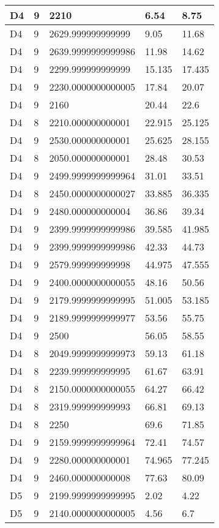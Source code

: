 \begin{longtable}{|l|l|l|l|l|}
D4 & 9 & 2210 & 6.54 & 8.75 \\ \hline
D4 & 9 & 2629.999999999999 & 9.05 & 11.68 \\ \hline
D4 & 9 & 2639.9999999999986 & 11.98 & 14.62 \\ \hline
D4 & 9 & 2299.999999999999 & 15.135 & 17.435 \\ \hline
D4 & 9 & 2230.0000000000005 & 17.84 & 20.07 \\ \hline
D4 & 9 & 2160 & 20.44 & 22.6 \\ \hline
D4 & 8 & 2210.000000000001 & 22.915 & 25.125 \\ \hline
D4 & 9 & 2530.000000000001 & 25.625 & 28.155 \\ \hline
D4 & 8 & 2050.000000000001 & 28.48 & 30.53 \\ \hline
D4 & 9 & 2499.9999999999964 & 31.01 & 33.51 \\ \hline
D4 & 8 & 2450.0000000000027 & 33.885 & 36.335 \\ \hline
D4 & 9 & 2480.000000000004 & 36.86 & 39.34 \\ \hline
D4 & 9 & 2399.9999999999986 & 39.585 & 41.985 \\ \hline
D4 & 9 & 2399.9999999999986 & 42.33 & 44.73 \\ \hline
D4 & 9 & 2579.999999999998 & 44.975 & 47.555 \\ \hline
D4 & 9 & 2400.0000000000055 & 48.16 & 50.56 \\ \hline
D4 & 9 & 2179.9999999999995 & 51.005 & 53.185 \\ \hline
D4 & 9 & 2189.9999999999977 & 53.56 & 55.75 \\ \hline
D4 & 9 & 2500 & 56.05 & 58.55 \\ \hline
D4 & 8 & 2049.9999999999973 & 59.13 & 61.18 \\ \hline
D4 & 8 & 2239.999999999995 & 61.67 & 63.91 \\ \hline
D4 & 8 & 2150.0000000000055 & 64.27 & 66.42 \\ \hline
D4 & 8 & 2319.999999999993 & 66.81 & 69.13 \\ \hline
D4 & 8 & 2250 & 69.6 & 71.85 \\ \hline
D4 & 9 & 2159.9999999999964 & 72.41 & 74.57 \\ \hline
D4 & 9 & 2280.000000000001 & 74.965 & 77.245 \\ \hline
D4 & 9 & 2460.000000000008 & 77.63 & 80.09 \\ \hline
D5 & 9 & 2199.9999999999995 & 2.02 & 4.22 \\ \hline
D5 & 9 & 2140.0000000000005 & 4.56 & 6.7 \\ \hline

\end{longtable}
